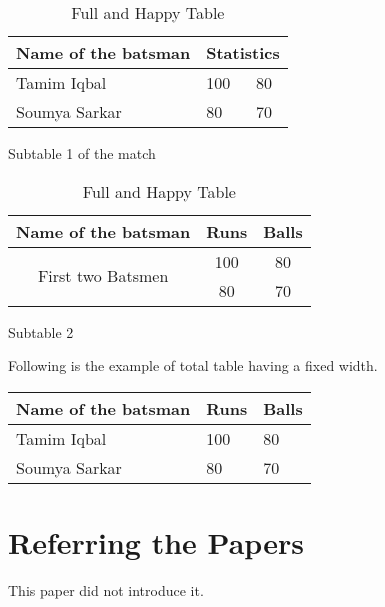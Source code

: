 \documentclass{article}
\begin{document}
\begin{table}[t!]
    \centering
    \begin{subtable}[t]{0.5\textwidth}
    \centering
        \begin{tabular}{||m{2cm}| m{2cm}| m{2cm}||}
        \hline
        Name of the batsman & \multicolumn{2}{c|}{Statistics} \\
        \hline
        \hline
        Tamim Iqbal & 100 & 80 \\
        \hline
        Soumya Sarkar & 80 & 70 \\
        \hline
        \end{tabular}
        \caption{Subtable 1 of the match}
        \label{subtab:1}
    \end{subtable}
    \begin{subtable}{0.5\textwidth}
    \centering
        \begin{tabular}{|c|c|c|}
        \hline
        Name of the batsman & Runs & Balls \\
        \hline
        \multirow{2}{*}{First two Batsmen} & 100 & 80 \\

        & 80 & 70 \\
        \hline
        \end{tabular}
        \caption{Subtable 2}
        \label{subtab:2}
    \end{subtable}
    \caption{Full and Happy Table}
    \label{tab:3}
\end{table}



Following is the example of total table having a fixed width.

\begin{tabu}to 0.8\textwidth{|X[c]|X[l]|X[r]|}
\hline
Name of the batsman & Runs & Balls \\[1ex]
\hline
\hline
Tamim Iqbal & 100 & 80 \\
\hline
Soumya Sarkar & 80 & 70 \\
\hline
\end{tabu}

\section{Referring the Papers}
This paper\cite{Han:2000} did not introduce it.







\printbibliography
% 
% 
\end{document}
